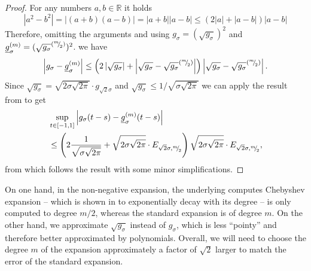 \documentclass[12pt]{article}
\begin{document}
\begin{proof}
    For any numbers $a, b \in \mathbb{R}$ it holds
    \begin{equation}
    | a^2 - b^2 | = | (a + b)(a - b) | = | a + b | | a - b | \leq (2 | a | + | a - b |)  | a - b |
    \end{equation}
    Therefore, omitting the arguments and using $g_{\sigma} = (\sqrt{g_{\sigma}})^2$ and $\underline{g}_{\sigma}^{(m)} = (\sqrt{g_{\sigma}}^{({}^{m}{\mskip -5mu/\mskip -3mu}_{2})})^2$.
    we have
    \begin{equation}
        \left| g_{\sigma} - \underline{g}_{\sigma}^{(m)} \right| \leq \left( 2 \left| \sqrt{g_{\sigma}} \right| + \left| \sqrt{g_{\sigma}} - \sqrt{g_{\sigma}}^{({}^{m}{\mskip -5mu/\mskip -3mu}_{2})} \right| \right) \left| \sqrt{g_{\sigma}} - \sqrt{g_{\sigma}}^{({}^{m}{\mskip -5mu/\mskip -3mu}_{2})} \right|.
    \end{equation}
    Since $\sqrt{g_{\sigma}} = \sqrt{2 \sigma \sqrt{2 \pi}} \cdot g_{\sqrt{2}\sigma}$ and $\sqrt{g_{\sigma}} \leq 1/\sqrt{\sigma \sqrt{2 \pi}}$ we can apply the result from  to get
    \begin{align}
        &\sup_{t \in [-1, 1]} \left| g_{\sigma}(t - s) - \underline{g}_{\sigma}^{(m)}(t - s) \right| \notag \\
        &\leq \left( 2 \frac{1}{\sqrt{ \sigma \sqrt{2\pi}}} + \sqrt{2 \sigma \sqrt{2 \pi}} \cdot E_{\sqrt{2}\sigma, {}^{m}{\mskip -5mu/\mskip -3mu}_{2}}\right)\sqrt{2 \sigma \sqrt{2 \pi}} \cdot E_{\sqrt{2}\sigma, {}^{m}{\mskip -5mu/\mskip -3mu}_{2}},
    \end{align}
    from which follows the result with some minor simplifications.
\end{proof}

On one hand, in the non-negative expansion, the underlying computes Chebyshev expansion -- which is shown in  to exponentially decay with its degree -- is only computed to degree $m/2$, whereas the standard expansion is of degree $m$. On the other hand, we approximate $\sqrt{g_{\sigma}}$ instead of $g_{\sigma}$, which is less \enquote{pointy} and therefore better approximated by polynomials. Overall, we will need to choose the degree $m$ of the expansion approximately a factor of $\sqrt{2}$ larger to match the error of the standard expansion.
\end{document}

